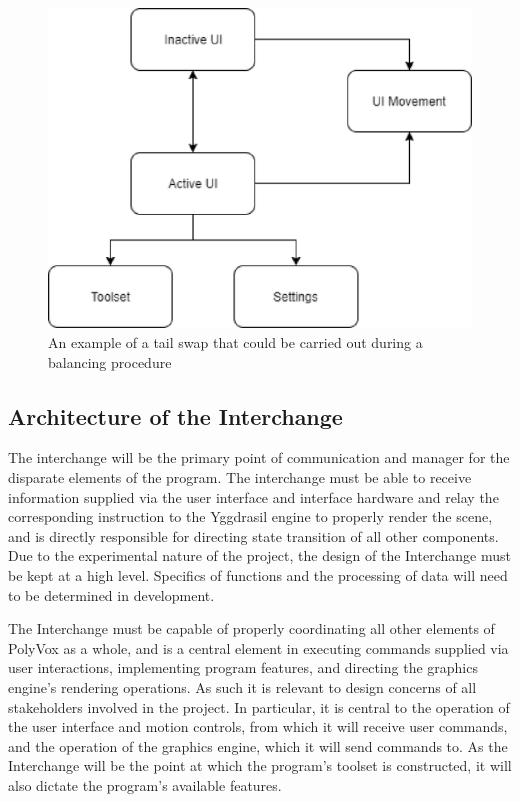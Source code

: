 \documentclass[onecolumn, draftclsnofoot,10pt, compsoc]{IEEEtran}
\begin{document}
\begin{figure}[H]
\begin{center}
\includegraphics[width=\textwidth]{images/UIDiagram.eps}
\caption{An example of a tail swap that could be carried out during a balancing procedure}
\end{center}
\end{figure}

\subsection{Architecture of the Interchange}
The interchange will be the primary point of communication and manager for the disparate elements of the program. The interchange must be able to receive information supplied via the user interface and interface hardware and relay the corresponding instruction to the Yggdrasil engine to properly render the scene, and is directly responsible for directing state transition of all other components. Due to the experimental nature of the project, the design of the Interchange must be kept at a high level. Specifics of functions and the processing of data will need to be determined in development. 

The Interchange must be capable of properly coordinating all other elements of PolyVox as a whole, and is a central element  in executing commands supplied via user interactions, implementing program features, and directing the graphics engine’s rendering operations. As such it is relevant to design concerns of all stakeholders involved in the project. In particular, it is central to the operation of the user interface and motion controls, from which it will receive user commands, and the operation of the graphics engine, which it will send commands to. As the Interchange will be the point at which the program’s toolset is constructed, it will also dictate the program’s available features.
\end{document}
